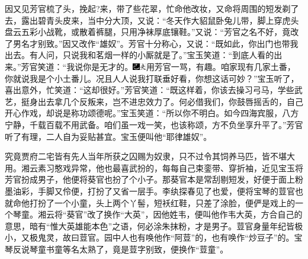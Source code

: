 因又见芳官梳了头，挽起?来，带了些花翠，忙命他改妆，又命将周围的短发剃了去，露出碧青头皮来，当中分大顶，又说：``冬天作大貂鼠卧兔儿带，脚上穿虎头盘云五彩小战靴，或散着裤腿，只用净袜厚底镶鞋。''又说：``芳官之名不好，竟改了男名才别致。''因又改作``雄奴''。芳官十分称心，又说：``既如此，你出门也带我出去。有人问，只说我和茗烟一样的小厮就是了。''宝玉笑道：``到底人看的出来。''芳官笑道：``我说你是无才的。{\includegraphics[width=3mm]{../Images/00003}\includegraphics[width=3mm]{../Images/00012}\footnotesize \kaishu 用芳官一骂，有趣。}咱家现有几家土番，你就说我是个小土番儿。况且人人说我打联垂好看，你想这话可妙？''宝玉听了，喜出意外，忙笑道：``这却很好。''芳官笑道：``既这样着，你该去操习弓马，学些武艺，挺身出去拿几个反叛来，岂不进忠效力了。何必借我们，你鼓唇摇舌的，自己开心作戏，却说是称功颂德呢。''宝玉笑道：``所以你不明白。如今四海宾服，八方宁静，千载百载不用武备。咱们虽一戏一笑，也该称颂，方不负坐享升平了。''芳官听了有理，二人自为妥贴甚宜。宝玉便叫他``耶律雄奴''。

究竟贾府二宅皆有先人当年所获之囚赐为奴隶，只不过令其饲养马匹，皆不堪大用。湘云素习憨戏异常，他也最喜武扮的，每每自己束銮带、穿折袖，近见宝玉将芳官扮成男子，他便将葵官也扮了个小子。那葵官本是常刮剔短发，好便于面上粉墨油彩，手脚又伶便，打扮了又省一层手。李纨探春见了也爱，便将宝琴的荳官也就命他打扮了一个小童，头上两个丫髻，短袄红鞋，只差了涂脸，便俨是戏上的一个琴童。湘云将``葵官''改了换作``大英''，因他姓韦，便叫他作韦大英，方合自己的意思，暗有``惟大英雄能本色''之语，何必涂朱抹粉，才是男子。荳官身量年纪皆极小，又极鬼灵，故曰荳官。园中人也有唤他作``阿荳''的，也有唤作``炒豆子''的。宝琴反说琴童书童等名太熟了，竟是荳字别致，便换作``荳童''。

